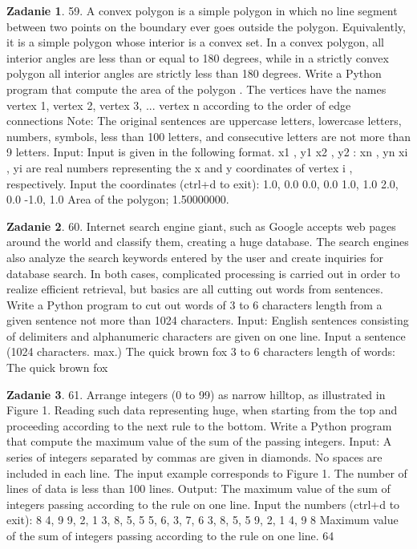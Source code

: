 \documentclass[11pt]{article}
\theoremstyle{definition}
\newtheorem{zadanie}{Zadanie}
\begin{document}
\begin{zadanie}
59. A convex polygon is a simple polygon in which no line segment between two points on the boundary ever goes outside the polygon. Equivalently, it is a simple polygon whose interior is a convex set. In a convex polygon, all interior angles are less than or equal to 180 degrees, while in a strictly convex polygon all interior angles are strictly less than 180 degrees.
Write a Python program that compute the area of the polygon . The vertices have the names vertex 1, vertex 2, vertex 3, ... vertex n according to the order of edge connections
Note: The original sentences are uppercase letters, lowercase letters, numbers, symbols, less than 100 letters, and consecutive letters are not more than 9 letters.
Input:
Input is given in the following format.
x1 , y1
x2 , y2
:
xn , yn
xi , yi are real numbers representing the x and y coordinates of vertex i , respectively.
Input the coordinates (ctrl+d to exit):
1.0, 0.0
0.0, 0.0
1.0, 1.0
2.0, 0.0
-1.0, 1.0
Area of the polygon;
1.50000000.
\end{zadanie}

\begin{zadanie}
60. Internet search engine giant, such as Google accepts web pages around the world and classify them, creating a huge database. The search engines also analyze the search keywords entered by the user and create inquiries for database search. In both cases, complicated processing is carried out in order to realize efficient retrieval, but basics are all cutting out words from sentences.
Write a Python program to cut out words of 3 to 6 characters length from a given sentence not more than 1024 characters.
Input:
English sentences consisting of delimiters and alphanumeric characters are given on one line.
Input a sentence (1024 characters. max.)
The quick brown fox
3 to 6 characters length of words:
The quick brown fox
\end{zadanie}

\begin{zadanie}
61. Arrange integers (0 to 99) as narrow hilltop, as illustrated in Figure 1. Reading such data representing huge, when starting from the top and proceeding according to the next rule to the bottom. Write a Python program that compute the maximum value of the sum of the passing integers.
Input:
A series of integers separated by commas are given in diamonds. No spaces are included in each line. The input example corresponds to Figure 1. The number of lines of data is less than 100 lines.
Output:
The maximum value of the sum of integers passing according to the rule on one line.
Input the numbers (ctrl+d to exit):
8
4, 9
9, 2, 1
3, 8, 5, 5
5, 6, 3, 7, 6
3, 8, 5, 5
9, 2, 1
4, 9
8
Maximum value of the sum of integers passing according to the rule on one line.
64
\end{zadanie}
\end{document}
